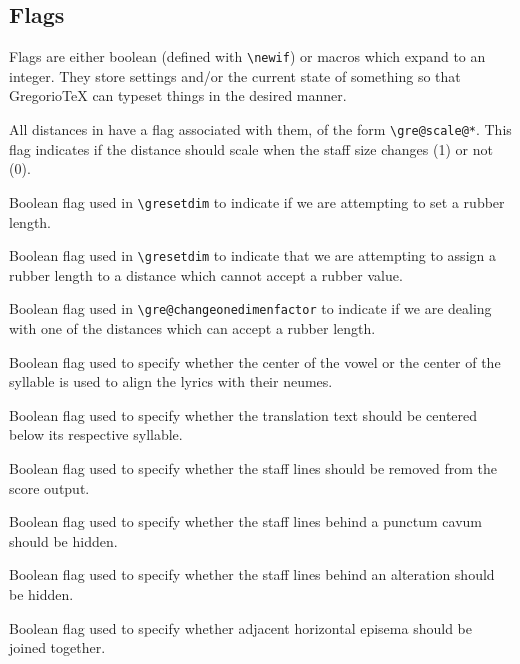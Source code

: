 \subsection{Flags}

Flags are either boolean (defined with \verb=\newif=) or macros which expand to an integer.  They store settings and/or the current state of something so that GregorioTeX can typeset things in the desired manner.

All distances in  have a flag associated with them, of the form \verb=\gre@scale@*=.  This flag
indicates if the distance should scale when the staff size changes (1)
or not (0).

Boolean flag used in \verb=\gresetdim= to indicate if we are attempting to set a rubber length.

Boolean flag used in \verb=\gresetdim= to indicate that we are attempting to assign a rubber length to a distance which cannot accept a rubber value.

Boolean flag used in \verb=\gre@changeonedimenfactor= to indicate if we are dealing with one of the distances which can accept a rubber length.

Boolean flag used to specify whether the center of the vowel or the center of the syllable is used to align the lyrics with their neumes.

Boolean flag used to specify whether the translation text should be centered below its respective syllable.

Boolean flag used to specify whether the staff lines should be removed from the score output.

Boolean flag used to specify whether the staff lines behind a punctum cavum should be hidden.

Boolean flag used to specify whether the staff lines behind an alteration should be hidden.

Boolean flag used to specify whether adjacent horizontal episema should be joined together.


